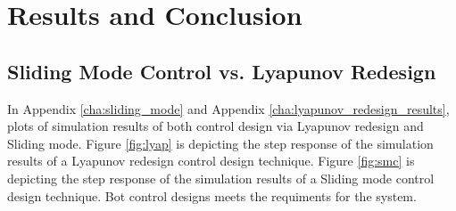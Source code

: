 \section{Results and Conclusion} %
\label{sec:results_and_conclusion}

\subsection{Sliding Mode Control vs. Lyapunov Redesign} %
\label{sub:sliding_mode_control_vs_lyapunov_redesign}
In Appendix \ref{cha:sliding_mode} and Appendix \ref{cha:lyapunov_redesign_results}, plots of simulation results of both
control design via Lyapunov redesign and Sliding mode. Figure \ref{fig:lyap} is depicting the step response of the
simulation results of a Lyapunov redesign control design technique. Figure \ref{fig:smc} is depicting the step response
of the simulation results of a Sliding mode control design technique. Bot control designs meets the requiments for the
system.
